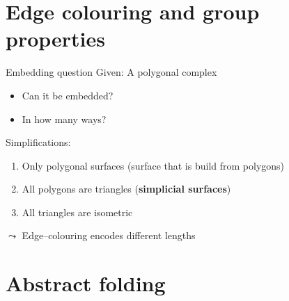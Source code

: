 \documentclass[11pt, handout]{beamer}
\begin{document}
            
\section{Edge colouring and group properties}
\frame{\tableofcontents[currentsection]}

\begin{frame}{Embedding question}
    \pause
    Given: A polygonal complex
    \begin{itemize}
        \pause
        \item Can it be embedded?
        \pause
        \item In how many ways?
    \end{itemize}
    \pause
    Simplifications:
    \begin{enumerate}
        \pause
        \item Only polygonal surfaces (surface that is build from polygons)
        \pause
        \item All polygons are triangles (\textbf{simplicial surfaces})
        \pause
        \item All triangles are isometric
    \end{enumerate}
    \pause
    $\leadsto$ Edge--colouring encodes different lengths
\end{frame}

\section{Abstract folding}
\frame{\tableofcontents[currentsection]}
\end{document}
